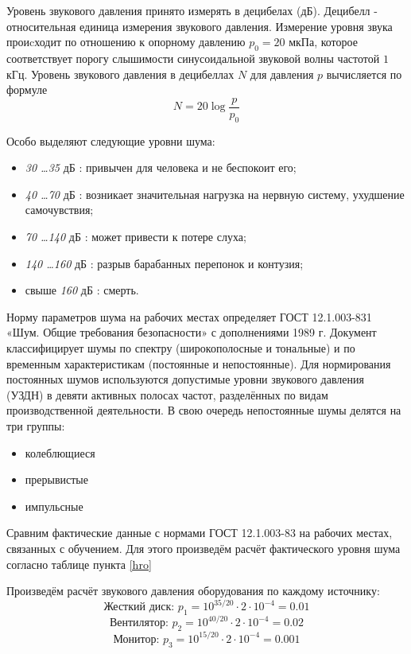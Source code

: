 Уровень звукового давления принято измерять в децибелах (дБ). Децибелл - отно\-сительная единица измерения звукового давления. Измерение уровня звука проиcходит по отношению к опорному давлению $p_0=20$ мкПа, которое соответствует порогу слы\-шимости синусоидальной звуковой волны частотой $1$ кГц. Уровень звукового давления в децибеллах $N$ для давления $p$ вычисля\-ется по формуле
$$
N = 20 \log \frac{p}{p_0}
$$

Особо выделяют следующие уровни шума:
\begin{itemize}
\item {\itshape 30 \ldots 35} дБ : привычен для человека и не беспокоит его;
\item {\itshape 40 \ldots 70} дБ : возникает значительная нагрузка на нервную систему, ухудшение самочувствия;
\item {\itshape 70 \ldots 140} дБ : может привести к потере слуха;
\item {\itshape 140 \ldots 160} дБ : разрыв барабанных перепонок и контузия;
\item свыше {\itshape  160} дБ : смерть.
\end{itemize}

Норму параметров шума на рабочих местах определяет ГОСТ 12.1.003-831 «Шум. Общие требования безопасности» с дополнениями 1989 г. Документ классифицирует шумы по спектру (широкополосные и тональные) и по вре\-менным характеристикам (постоянные и непостоянные). Для нормирования постоянных шумов используются допустимые уровни звукового давления \\(УЗДН) в девяти активных полосах частот, разделённых по видам произ\-водственной деятельности. В свою очередь непостоянные шумы делятся на три груп\-пы:

\begin{itemize}
\item колеблющиеся
\item прерывистые
\item импульсные
\end{itemize}

Сравним фактические данные с нормами ГОСТ 12.1.003-83 на рабочих местах, связа\-нных с обучением. Для этого произведём расчёт фактического уровня шума согласно таблице пункта \ref{hro}

Произведём расчёт звукового давления оборудования по каждому источ\-нику:
$$
\mbox{Жесткий диск: } p_1= 10^{35/20}\cdot 2 \cdot 10^{-4} = 0.01
$$
$$
\mbox{Вентилятор: } p_2= 10^{40/20}\cdot 2 \cdot 10^{-4} = 0.02
$$
$$
\mbox{Монитор: } p_3= 10^{15/20}\cdot 2 \cdot 10^{-4} = 0.001
$$

